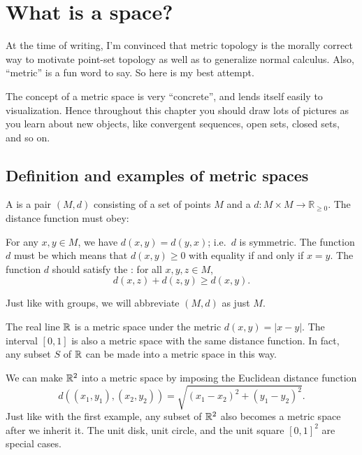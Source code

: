 \chapter{What is a space?}
At the time of writing, I'm convinced that metric topology is the morally correct way to motivate point-set topology as well as to generalize normal calculus.
Also, ``metric'' is a fun word to say.
So here is my best attempt.

The concept of a metric space is very ``concrete'', and lends itself easily to visualization. Hence throughout this chapter you should draw lots of pictures as you learn about new objects, like convergent sequences, open sets, closed sets, and so on.

\section{Definition and examples of metric spaces}
\begin{definition}
	A  is a pair $(M, d)$ consisting of
	a set of points $M$
	and a  $d : M \times M \to \mathbb R_{\ge 0}$.
	The distance function must obey:
	\begin{itemize}
		\ii For any $x,y \in M$, we have $d(x,y) = d(y,x)$; i.e.\ $d$ is symmetric.
		\ii The function $d$ must be 
		which means that $d(x,y) \ge 0$ with equality if and only if $x=y$.
		\ii The function $d$ should satisfy the : for all $x,y,z \in M$,
		\[ d(x,z) + d(z,y) \ge d(x,y). \]
	\end{itemize}
\end{definition}
\begin{abuse}
	Just like with groups, we will abbreviate $(M,d)$ as just $M$.
\end{abuse}
\begin{example}
	\listhack
	\begin{enumerate}[(a)]
		\ii The real line $\mathbb R$ is a metric space under the metric $d(x,y) = \left\lvert x-y \right\rvert$.
		\ii The interval $[0,1]$ is also a metric space with the same distance function.
		\ii In fact, any subset $S$ of $\mathbb R$ can be made into a metric space in this way.
	\end{enumerate}
\end{example}
\begin{example}
	\listhack
	\begin{enumerate}[(a)]
		\ii We can make $\mathbb R^2$ into a metric space by imposing the Euclidean distance function
		\[ d\left( (x_1, y_1), (x_2, y_2) \right) = \sqrt{(x_1-x_2)^2 + (y_1-y_2)^2}. \]
		\ii Just like with the first example, any subset of $\mathbb R^2$ also becomes a metric space after we inherit it.
		The unit disk, unit circle, and the unit square $[0,1]^2$
		are special cases.
	\end{enumerate}
\end{example}
